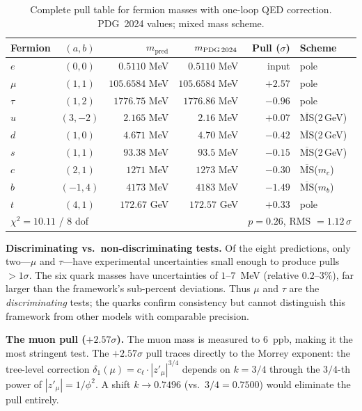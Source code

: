 \documentclass[12pt,a4paper]{article}
\theoremstyle{definition}
\begin{document}
\begin{table}[H]
\centering
\begin{tabular}{lcrrrl}
\toprule
\textbf{Fermion} & $(a,b)$ & $m_{\text{pred}}$ & $m_{\text{PDG\,2024}}$ & \textbf{Pull ($\sigma$)} & \textbf{Scheme} \\
\midrule
$e$   & $(0,0)$  & $0.5110$ MeV  & $0.5110$ MeV  & input   & pole \\
$\mu$ & $(1,1)$  & $105.6584$ MeV& $105.6584$ MeV& $+2.57$ & pole \\
$\tau$& $(1,2)$  & $1776.75$ MeV & $1776.86$ MeV & $-0.96$ & pole \\
$u$   & $(3,-2)$ & $2.165$ MeV   & $2.16$ MeV    & $+0.07$ & $\overline{\text{MS}}$(2\,GeV) \\
$d$   & $(1,0)$  & $4.671$ MeV   & $4.70$ MeV    & $-0.42$ & $\overline{\text{MS}}$(2\,GeV) \\
$s$   & $(1,1)$  & $93.38$ MeV   & $93.5$ MeV    & $-0.15$ & $\overline{\text{MS}}$(2\,GeV) \\
$c$   & $(2,1)$  & $1271$ MeV    & $1273$ MeV    & $-0.30$ & $\overline{\text{MS}}$($m_c$) \\
$b$   & $(-1,4)$ & $4173$ MeV    & $4183$ MeV    & $-1.49$ & $\overline{\text{MS}}$($m_b$) \\
$t$   & $(4,1)$  & $172.67$ GeV  & $172.57$ GeV  & $+0.33$ & pole \\
\midrule
\multicolumn{4}{l}{$\chi^2 = 10.11$ / 8 dof} & \multicolumn{2}{l}{$p = 0.26$, RMS $= 1.12\,\sigma$} \\
\bottomrule
\end{tabular}
\caption{Complete pull table for fermion masses with one-loop QED correction.  PDG~2024 values; mixed mass scheme.}
\label{tab:S-pulls}
\end{table}

\textbf{Discriminating vs.\ non-discriminating tests.}  Of the eight predictions, only two---$\mu$ and $\tau$---have experimental uncertainties small enough to produce pulls $> 1\sigma$.  The six quark masses have uncertainties of $1$--$7$~MeV (relative $0.2$--$3\%$), far larger than the framework's sub-percent deviations.  Thus $\mu$ and $\tau$ are the \emph{discriminating} tests; the quarks confirm consistency but cannot distinguish this framework from other models with comparable precision.

\textbf{The muon pull ($+2.57\sigma$).}  The muon mass is measured to $6$~ppb, making it the most stringent test.  The $+2.57\sigma$ pull traces directly to the Morrey exponent: the tree-level correction $\delta_1(\mu) = c_\ell \cdot |z'_\mu|^{3/4}$ depends on $k = 3/4$ through the $3/4$-th power of $|z'_\mu| = 1/\phi^2$.  A shift $k \to 0.7496$ (vs.\ $3/4 = 0.7500$) would eliminate the pull entirely.
\end{document}

